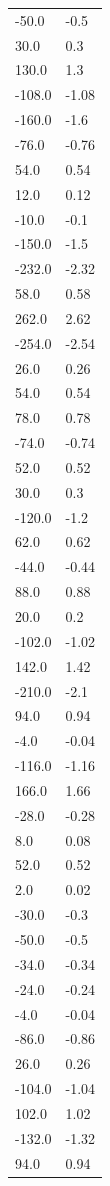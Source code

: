 \begin{longtable}{ll}
-50.0 & -0.5 \\
30.0 & 0.3 \\
130.0 & 1.3 \\
-108.0 & -1.08 \\
-160.0 & -1.6 \\
-76.0 & -0.76 \\
54.0 & 0.54 \\
12.0 & 0.12 \\
-10.0 & -0.1 \\
-150.0 & -1.5 \\
-232.0 & -2.32 \\
58.0 & 0.58 \\
262.0 & 2.62 \\
-254.0 & -2.54 \\
26.0 & 0.26 \\
54.0 & 0.54 \\
78.0 & 0.78 \\
-74.0 & -0.74 \\
52.0 & 0.52 \\
30.0 & 0.3 \\
-120.0 & -1.2 \\
62.0 & 0.62 \\
-44.0 & -0.44 \\
88.0 & 0.88 \\
20.0 & 0.2 \\
-102.0 & -1.02 \\
142.0 & 1.42 \\
-210.0 & -2.1 \\
94.0 & 0.94 \\
-4.0 & -0.04 \\
-116.0 & -1.16 \\
166.0 & 1.66 \\
-28.0 & -0.28 \\
8.0 & 0.08 \\
52.0 & 0.52 \\
2.0 & 0.02 \\
-30.0 & -0.3 \\
-50.0 & -0.5 \\
-34.0 & -0.34 \\
-24.0 & -0.24 \\
-4.0 & -0.04 \\
-86.0 & -0.86 \\
26.0 & 0.26 \\
-104.0 & -1.04 \\
102.0 & 1.02 \\
-132.0 & -1.32 \\
94.0 & 0.94 \\

\end{longtable}
